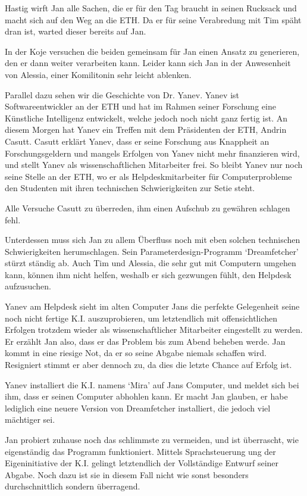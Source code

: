 \documentclass[11pt,a4paper,ngerman]{scrreprt}
\begin{document}
Hastig wirft Jan alle Sachen, die er für den Tag braucht in seinen Rucksack und
macht sich auf den Weg an die ETH. Da er für seine Verabredung mit Tim späht
dran ist, warted dieser bereits auf Jan.

In der Koje versuchen die beiden gemeinsam für Jan einen Ansatz zu generieren,
den er dann weiter verarbeiten kann. Leider kann sich Jan in der Anwesenheit von
Alessia, einer Komilitonin sehr leicht ablenken.

Parallel dazu sehen wir die Geschichte von Dr. Yanev. Yanev ist
Softwareentwickler an der ETH und hat im Rahmen seiner Forschung eine Künstliche
Intelligenz entwickelt, welche jedoch noch nicht ganz fertig ist. An diesem
Morgen hat Yanev ein Treffen mit dem Präsidenten der ETH, Andrin
Casutt. Casutt erklärt Yanev, dass er seine Forschung aus Knappheit an
Forschungsgeldern und mangels Erfolgen von Yanev nicht mehr finanzieren wird,
und stellt Yanev als wissenschaftlichen Mitarbeiter frei. So bleibt Yanev nur
noch seine Stelle an der ETH, wo er als Helpdeskmitarbeiter für Computerprobleme
den Studenten mit ihren technischen Schwierigkeiten zur Setie steht.

Alle Versuche Casutt zu überreden, ihm einen Aufschub zu gewähren schlagen
fehl.

Unterdessen muss sich Jan zu allem Überfluss noch mit eben solchen technischen
Schwierigkeiten herumschlagen. Sein Parameterdesign-Programm `Dreamfetcher'
stürzt ständig ab. Auch Tim und Alessia, die sehr gut mit Computern umgehen
kann, können ihm nicht helfen, weshalb er sich gezwungen fühlt, den Helpdesk
aufzusuchen.

Yanev am Helpdesk sieht im alten Computer Jans die perfekte Gelegenheit seine
noch nicht fertige K.I. auszuprobieren, um letztendlich mit offensichtlichen
Erfolgen trotzdem wieder als wissenschaftlicher Mitarbeiter eingestellt zu
werden. Er erzählt Jan also, dass er das Problem bis zum Abend beheben
werde. Jan kommt in eine riesige Not, da er so seine Abgabe niemals schaffen
wird. Resigniert stimmt er aber dennoch zu, da dies die letzte Chance auf Erfolg
ist.

Yanev installiert die K.I. namens `Mira' auf Jans Computer, und meldet sich bei
ihm, dass er seinen Computer abhohlen kann. Er macht Jan glauben, er habe
lediglich eine neuere Version von Dreamfetcher installiert, die jedoch viel
mächtiger sei.

Jan probiert zuhause noch das schlimmste zu vermeiden, und ist überrascht, wie
eigenständig das Programm funktioniert. Mittels Sprachsteuerung ung der
Eigeninitiative der K.I. gelingt letztendlich der Vollständige Entwurf seiner
Abgabe. Noch dazu ist sie in diesem Fall nicht wie sonst besonders
durchschnittlich sondern überragend.
\end{document}
